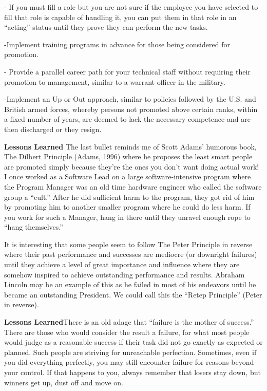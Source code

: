 \documentclass{book}
\begin{document}
- If you must fill a role but you are not sure if the
employee you have selected to fill that role is capable
of handling it, you can put them in that role in an
“acting” status until they prove they can perform the
new tasks.

-Implement training programs in advance for those
being considered for promotion.

- Provide a parallel career path for your technical staff
without requiring their promotion to management,
similar to a warrant officer in the military.

-Implement an Up or Out approach, similar to policies
followed by the U.S. and British armed forces,
whereby persons not promoted above certain ranks,
within a fixed number of years, are deemed to lack
the necessary competence and are then discharged or
they resign.

\textbf{Lessons Learned} The last bullet reminds me
of Scott Adams’ humorous book, The Dilbert
Principle (Adams, 1996) where he proposes the
least smart people are promoted simply because
they’re the ones you don’t want doing actual work!
I once worked as a Software Lead on a large
software-intensive program where the Program
Manager was an old time hardware engineer who
called the software group a “cult.” After he did
sufficient harm to the program, they got rid of
him by promoting him to another smaller program
where he could do less harm. If you work
for such a Manager, hang in there until they
unravel enough rope to “hang themselves.”

It is interesting that some people seem to follow The Peter
Principle in reverse where their past performance and successes
are mediocre (or downright failures) until they achieve
a level of great importance and influence where they are
somehow inspired to achieve outstanding performance and
results. Abraham Lincoln may be an example of this as he
failed in most of his endeavors until he became an outstanding
President. We could call this the “Retep Principle” (Peter
in reverse).

\textbf{Lessons Learned}There is an old adage that
“failure is the mother of success.” There are
those who would consider the result a failure,
for what most people would judge as a reasonable
success if their task did not go exactly as
expected or planned. Such people are striving for
unreachable perfection. Sometimes, even if you
did everything perfectly, you may still encounter
failure for reasons beyond your control. If that
happens to you, always remember that losers stay
down, but winners get up, dust off and move on.
\end{document}
